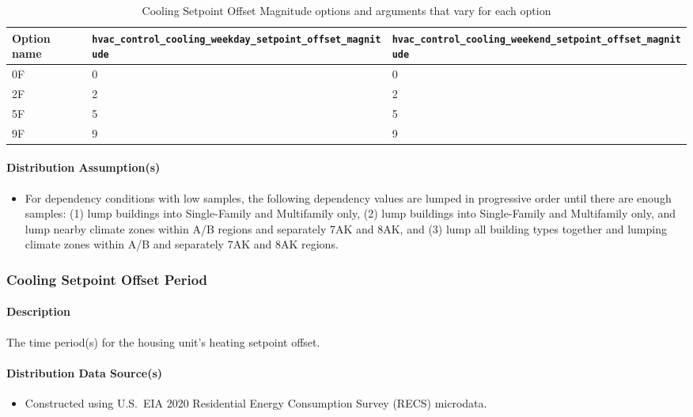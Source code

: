 \begin{longtable}[]{ |p{}|p{4cm}|p{4cm}| }
\caption{Cooling Setpoint Offset Magnitude options and arguments that vary for each option} \label{table:hc_opt_cl_stp_mag} \\  
\toprule\noalign{}
Option name &
\texttt{hvac\_control\_cooling\_weekday\_setpoint\_offset\_magnitude} &
\texttt{hvac\_control\_cooling\_weekend\_setpoint\_offset\_magnitude} \\
\midrule\noalign{}
\endhead
\bottomrule\noalign{}
\endlastfoot
0F & 0 & 0 \\
2F & 2 & 2 \\
5F & 5 & 5 \\
9F & 9 & 9 \\
\end{longtable}

\paragraph{Distribution Assumption(s)}
\begin{itemize}
    \item For dependency conditions with low samples, the following dependency values are lumped in progressive order until there are enough samples: (1) lump buildings into Single-Family and Multifamily only, (2) lump buildings into Single-Family and Multifamily only, and lump nearby climate zones within A/B regions and separately 7AK and 8AK, and (3) lump all building types together and lumping climate zones within A/B and separately 7AK and 8AK regions.
\end{itemize}

\subsubsection{Cooling Setpoint Offset Period}
\paragraph{Description}
The time period(s) for the housing unit's heating setpoint offset.

\paragraph{Distribution Data Source(s)}
\begin{itemize}
    \item Constructed using U.S.~EIA 2020 Residential Energy Consumption Survey (RECS) microdata.
\end{itemize}

